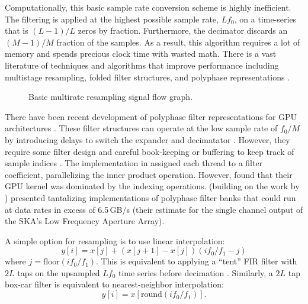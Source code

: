Computationally, this basic sample rate conversion scheme is highly inefficient.  The filtering is applied at 
the highest possible sample rate, $Lf_0$, on a time-series that is $(L-1)/L$ zeros by fraction. Furthermore, the 
decimator discards an $(M-1)/M$ fraction of the samples.  As a result, this algorithm requires a lot of memory 
and spends precious clock time with wasted math.  There is a vast literature of techniques and algorithms that 
improve performance including multistage resampling, folded filter structures, and polyphase representations 
\citep{oppenheim10,lyons11,vaidyanathan93}.

\begin{figure}[t]
\centering
{}
\caption{Basic multirate resampling signal flow graph.}
\end{figure}

There have been recent development of polyphase filter representations for GPU architectures 
\citep[i.e.][]{vanderveldt12,adamek14,kim14a}.  These filter structures can operate at the low sample rate of 
$f_0/M$
by introducing delays to switch the expander and decimatator \citep{crochiere81}.  However, they require 
some filter design and careful book-keeping or buffering to keep track of sample indices \citep{wang01}.
The implementation in \citet{kim14a} assigned each thread to a filter coefficient, parallelizing the 
inner product operation.  However, \citet{kim14a} found that their GPU kernel was dominated by the 
indexing operations.  \citet{adamek14} (building on the work by \citet{vanderveldt12}) presented tantalizing 
implementations of 
polyphase filter banks that could run at data rates in excess of 6.5\,GB/s (their estimate for the single channel 
output of the SKA's Low Frequency Aperture Array).


A simple option for resampling is to use linear interpolation:
\begin{equation}
y[i] = x[j] + (x[j+1] - x[j]) (if_0/f_1 - j)
\end{equation}
where $j = \mathrm{floor}(if_0/f_1)$.  This is equivalent to applying a ``tent'' FIR filter with $2L$ taps on the 
upsampled $Lf_0$ time series before decimation \citep{oppenheim10}.  Similarly, a $2L$ tap box-car filter is 
equivalent to nearest-neighbor interpolation:
\begin{equation}
y[i] = x[\mathrm{round}(if_0/f_1)].
\end{equation}

